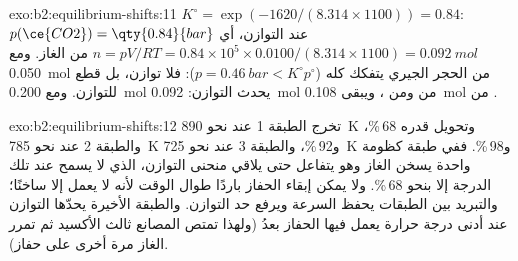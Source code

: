 \begin{solution}{exo:b2:equilibrium-shifts:11}
$K^\circ = \exp(-1620/(8.314 \times 1100)) = 0.84$: $p(\ce{CO2}) =
\qty{0.84}{bar}$ عند التوازن، أي $n = pV/RT = 0.84 \times 10^5 \times
0.0100/(8.314 \times 1100) = \qty{0.092}{mol}$ من الغاز. ومع \qty{0.050}{mol}
من الحجر الجيري يتفكك كله ($p = \qty{0.46}{bar} < K^\circ p^\circ$):
فلا توازن، بل قطع للتوازن. ومع \qty{0.200}{mol} يحدث التوازن:
\qty{0.092}{mol} من  ومن ، ويبقى \qty{0.108}{mol} من .
\end{solution}

\begin{solution}{exo:b2:equilibrium-shifts:12}
تخرج الطبقة 1 عند نحو \qty{890}{K} وتحويل قدره 68\,\%، والطبقة 2 عند نحو
\qty{785}{K} و92\,\%، والطبقة 3 عند نحو \qty{725}{K} و98\,\%. ففي طبقة
كظومة واحدة يسخن الغاز وهو يتفاعل حتى يلاقي منحنى
التوازن، الذي لا يسمح عند تلك الدرجة إلا بنحو 68\,\%. ولا يمكن إبقاء الحفاز
باردًا طوال الوقت لأنه لا يعمل إلا ساخنًا؛ والتبريد
بين الطبقات يحفظ السرعة ويرفع حد التوازن. والطبقة الأخيرة
يحدّها التوازن عند أدنى درجة حرارة يعمل فيها الحفاز
بعدُ (ولهذا تمتص المصانع ثالث الأكسيد ثم تمرر الغاز مرة أخرى على
حفاز).
\end{solution}

